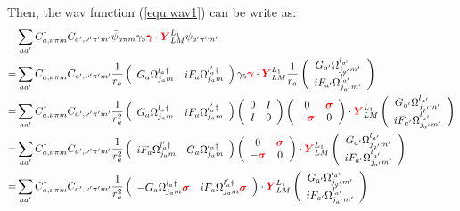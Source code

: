 \documentclass[a4paper]{article}
\newcommand{\no}{\nonumber}
\newcommand{\bmm}[1]{{\color{red}\bm{#1}}}
\begin{document}
Then, the wav function (\ref{equ:wav1}) can be write as:
\begin{align}
\no&\sum_{aa'}C_{a, \nu\pi m}^{\dag} C_{a',\nu'\pi'm'}\bar{\psi}_{a\pi m}\gamma_{5}\bmm{\gamma}\cdot\bmm{Y}_{LM}^{L_{1}}\psi_{a'\pi'm'}\\
\no=&\sum_{aa'}C_{a,\nu\pi m}^{\dag}C_{a',\nu'\pi'm'}\frac{1}{r_{a}}\left(\begin{array}{cc}G_{a}\Omega_{j_{a}m}^{l_{a}\dag}&iF_{a}\Omega_{j_{a}m}^{l_{a}'\dag}\end{array}\right)\gamma_{5}\bmm{\gamma}\cdot\bmm{Y}_{LM}^{L_{1}}\frac{1}{r_{a}}\left(\begin{array}{c}G_{a'}\Omega_{j_{a'}m'}^{l_{a'}}\\iF_{a'}\Omega_{j_{a'}m'}^{l_{a'}'}\end{array}\right)\\
\no=&\sum_{aa'}C_{a,\nu \pi m}^{\dag}C_{a',\nu'\pi'm'}\frac{1}{r_{a}^{2}}\left(\begin{array}{cc}G_{a}\Omega_{j_{a}m}^{l_{a}\dag}&iF_{a}\Omega_{j_{a}m}^{l_{a}'\dag}\end{array}\right)\left(\begin{array}{cc}0&I\\I&0\end{array}\right)\left(\begin{array}{cc}0&\bmm{\sigma}\\-\bmm{\sigma}&0\end{array}\right)\cdot\bmm{Y}_{LM}^{L_{1}}\left(\begin{array}{c}G_{a'}\Omega_{j_{a'}m'}^{l_{a'}}\\iF_{a'}\Omega_{j_{a'}m'}^{l_{a'}'}\end{array}\right)\\
\no=&\sum_{aa'}C_{a,\nu\pi m}^{\dag}C_{a',\nu'\pi'm'}\frac{1}{r_{a}^{2}}\left(\begin{array}{cc}iF_{a}\Omega_{j_{a}m}^{l_{a}'\dag} & G_{a}\Omega_{j_{a}m}^{l_{a}\dag}\end{array}\right)\left(\begin{array}{cc}0&\bmm{\sigma}\\-\bmm{\sigma}&0\end{array}\right)\cdot\bmm{Y}_{LM}^{L_{1}}\left(\begin{array}{c}G_{a'}\Omega_{j_{a'}m'}^{l_{a'}}\\iF_{a'}\Omega_{j_{a'}m'}^{l_{a'}'}\end{array}\right)\\
\no=&\sum_{aa'}C_{a,\nu\pi m}^{\dag}C_{a',\nu'\pi'm'}\frac{1}{r_{a}^{2}}\left(\begin{array}{cc}-G_{a}\Omega_{j_{a}m}^{l_{a}\dag}\bmm{\sigma}&iF_{a}\Omega_{j_{a}m}^{l_{a}'\dag}\bmm{\sigma}\end{array}\right)\cdot\bmm{Y}_{LM}^{L_{1}}\left(\begin{array}{c}G_{a'}\Omega_{j_{a'}m'}^{l_{a'}}\\iF_{a'}\Omega_{j_{a'}m'}^{l_{a'}'}\end{array}\right)\\

\end{align}
\end{document}
